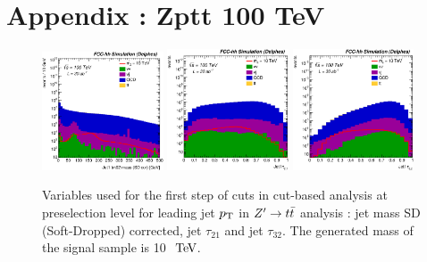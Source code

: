 \documentclass{cernrep}
\begin{document}
\clearpage
\newpage

\section{Appendix : Zptt 100 TeV}
\label{appendix:zptt100}


\begin{figure}[!htb]\centering
\includegraphics[width=0.32\textwidth]{Fig/Zptt/Jet1_trk02_SD_Cor_m_sel0_nostack_log.eps}
\includegraphics[width=0.32\textwidth]{Fig/Zptt/Jet1_tau21_sel0_nostack_log.eps}
\includegraphics[width=0.32\textwidth]{Fig/Zptt/Jet1_tau32_sel0_nostack_log.eps}
\caption{Variables used for the first step of cuts in cut-based analysis at preselection level for leading jet $p\sb{\scriptstyle\mathrm{T}}$ in $Z^{\prime} \rightarrow t\bar{t}$ analysis : jet mass SD (Soft-Dropped) corrected, jet $\tau_{21}$ and jet $\tau_{32}$. The generated mass of the signal sample is 10 $\TeV$.}
\label{fig:Zptt_sel0_cut}
\end{figure}
\end{document}
